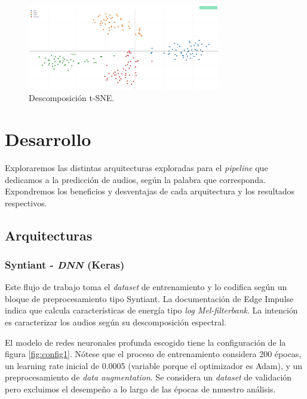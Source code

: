 \documentclass[10pt]{article}
\begin{document}
\begin{figure}
    \centering
    \includegraphics[width=0.75\textwidth]{t-sne - Data Explorer.png}
    \caption{Descomposición t-SNE.}
    \label{fig:tsne}
\end{figure}



\section*{Desarrollo}

Exploraremos las distintas arquitecturas exploradas para el \textit{pipeline} que dedicamos a la predicción de audios, según la palabra que corresponda. Expondremos los beneficios y desventajas de cada arquitectura y los resultados respectivos. 

\subsection*{Arquitecturas}

\subsubsection*{Syntiant - \textit{DNN} (Keras)}

Este flujo de trabajo toma el \textit{dataset} de entrenamiento y lo codifica según un bloque de preprocesamiento tipo Syntiant. La documentación de Edge Impulse indica que calcula características de energía tipo \textit{log Mel-filterbank}. La intención es caracterizar los audios según su descomposición espectral.

El modelo de redes neuronales profunda escogido tiene la configuración de la figura \ref{fig:config1}. Nótese que el proceso de entrenamiento considera 200 épocas, un learning rate inicial de 0.0005 (variable porque el optimizador es Adam), y un preprocesamiento de \textit{data augmentation}. Se considera un \textit{dataset} de validación pero excluimos el desempeño a lo largo de las épocas de nnuestro análisis.
\end{document}
